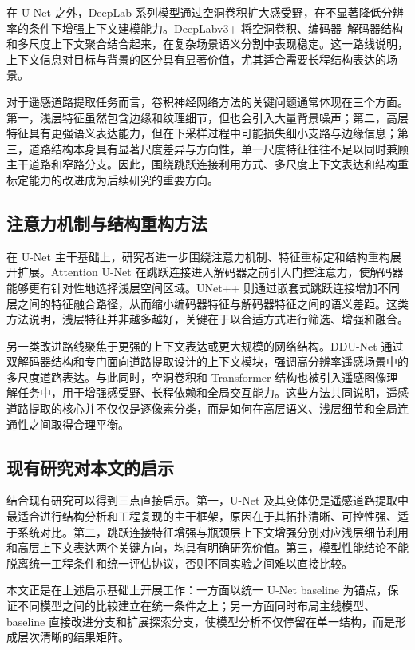 在 U-Net 之外，DeepLab 系列模型通过空洞卷积扩大感受野，在不显著降低分辨率的条件下增强上下文建模能力。DeepLabv3+ 将空洞卷积、编码器--解码器结构和多尺度上下文聚合结合起来，在复杂场景语义分割中表现稳定\cite{deeplabv3plus2018}。这一路线说明，上下文信息对目标与背景的区分具有显著价值，尤其适合需要长程结构表达的场景。

对于遥感道路提取任务而言，卷积神经网络方法的关键问题通常体现在三个方面。第一，浅层特征虽然包含边缘和纹理细节，但也会引入大量背景噪声；第二，高层特征具有更强语义表达能力，但在下采样过程中可能损失细小支路与边缘信息；第三，道路结构本身具有显著尺度差异与方向性，单一尺度特征往往不足以同时兼顾主干道路和窄路分支。因此，围绕跳跃连接利用方式、多尺度上下文表达和结构重标定能力的改进成为后续研究的重要方向。

\subsection{注意力机制与结构重构方法}
在 U-Net 主干基础上，研究者进一步围绕注意力机制、特征重标定和结构重构展开扩展。Attention U-Net 在跳跃连接进入解码器之前引入门控注意力，使解码器能够更有针对性地选择浅层空间区域\cite{attentionunet2018}。UNet++ 则通过嵌套式跳跃连接增加不同层之间的特征融合路径，从而缩小编码器特征与解码器特征之间的语义差距\cite{unetpp2018}。这类方法说明，浅层特征并非越多越好，关键在于以合适方式进行筛选、增强和融合。

另一类改进路线聚焦于更强的上下文表达或更大规模的网络结构。DDU-Net 通过双解码器结构和专门面向道路提取设计的上下文模块，强调高分辨率遥感场景中的多尺度道路表达\cite{ddu2022}。与此同时，空洞卷积\cite{dilated2016}和 Transformer 结构\cite{swin2021}也被引入遥感图像理解任务中，用于增强感受野、长程依赖和全局交互能力。这些方法共同说明，遥感道路提取的核心并不仅仅是逐像素分类，而是如何在高层语义、浅层细节和全局连通性之间取得合理平衡。

\subsection{现有研究对本文的启示}
结合现有研究可以得到三点直接启示。第一，U-Net 及其变体仍是遥感道路提取中最适合进行结构分析和工程复现的主干框架，原因在于其拓扑清晰、可控性强、适于系统对比。第二，跳跃连接特征增强与瓶颈层上下文增强分别对应浅层细节利用和高层上下文表达两个关键方向，均具有明确研究价值。第三，模型性能结论不能脱离统一工程条件和统一评估协议，否则不同实验之间难以直接比较。

本文正是在上述启示基础上开展工作：一方面以统一 U-Net baseline 为锚点，保证不同模型之间的比较建立在统一条件之上；另一方面同时布局主线模型、baseline 直接改进分支和扩展探索分支，使模型分析不仅停留在单一结构，而是形成层次清晰的结果矩阵。

